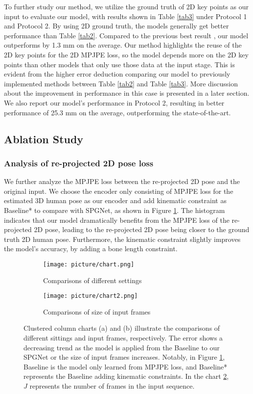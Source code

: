 \documentclass[runningheads]{llncs}
\begin{document}
To further study our method, we utilize the ground truth of 2D key points as our input to evaluate our model, with results shown in Table \ref{tab3} under Protocol 1 and Protocol 2. By using 2D ground truth, the models generally get better performance than Table \ref{tab2}. Compared to the previous best result \cite{Liu_2020_CVPR}, our model outperforms by 1.3 mm on the average. Our method highlights the reuse of the 2D key points for the 2D MPJPE loss, so the model depends more on the 2D key points than other models that only use those data at the input stage. This is evident from the higher error deduction comparing our model to previously implemented methods between Table \ref{tab2} and Table \ref{tab3}. More discussion about the improvement in performance in this case is presented in a later section. We also report our model's performance in Protocol 2, resulting in better performance of 25.3 mm on the average, outperforming the state-of-the-art.


\subsection{Ablation Study}

\subsubsection{Analysis of re-projected 2D pose loss} We further analyze the MPJPE loss between the re-projected 2D pose and the original input. We choose the encoder only consisting of MPJPE loss for the estimated 3D human pose as our encoder and add kinematic constraint as Baseline* to compare with SPGNet, as shown in Figure \ref{fig:sub1}. The histogram indicates that our model dramatically benefits from the MPJPE loss of the re-projected 2D pose, leading to the re-projected 2D pose being closer to the ground truth 2D human pose. Furthermore, the kinematic constraint slightly improves the model's accuracy, by adding a bone length constraint.

\begin{figure}[!htp]
\centering
\begin{subfigure}{.5\textwidth}
  \centering
  \texttt{[image: picture/chart.png]}
  \caption{Comparisons of different settings}
  \label{fig:sub1}
\end{subfigure}\begin{subfigure}{.5\textwidth}
  \centering
  \texttt{[image: picture/chart2.png]}
  \caption{Comparisons of size of input frames}
  \label{fig:sub2}
\end{subfigure}
\caption{Clustered column charts (a) and (b) illustrate the comparisons of different sittings and input frames, respectively. The error shows a decreasing trend as the model is applied from the Baseline to our SPGNet or the size of input frames increases. Notably, in Figure \ref{fig:sub1}, Baseline is the model only learned from MPJPE loss, and Baseline* represents the Baseline adding kinematic constraints. In the chart \ref{fig:sub2}, \(J\) represents the number of frames in the input sequence.}
\label{fig:ablation}
\end{figure}
\end{document}
